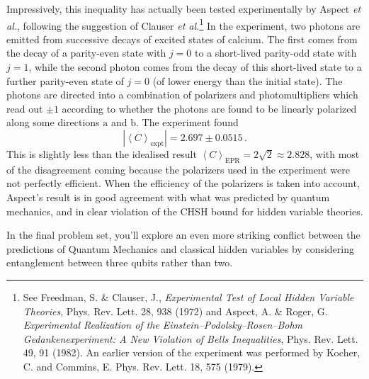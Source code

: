 \documentclass{article}
\theoremstyle{plain}\theoremheaderfont{\normalfont\itshape}\theorembodyfont{\rmfamily}\theoremseparator{.}\newtheorem*{rem}{Remark}\newtheorem*{ex}{Example}\newtheorem*{proof}{Proof}\newtheorem*{altp}{Alternative proof}
\theoremstyle{plain}\theoremheaderfont{\normalfont\bfseries}\theorembodyfont{\rmfamily}\theoremseparator{.}\newtheorem{thm}{Theorem}[section]\newtheorem{lem}[thm]{Lemma}\newtheorem{prop}[thm]{Proposition}\newtheorem*{cor}{Corollary}\newtheorem{defn}[thm]{Definition}\newtheorem{clm}[thm]{Claim}\newtheorem{clminproof}{Claim}
\theoremstyle{break}\theoremheaderfont{\normalfont\itshape}\theorembodyfont{\rmfamily}\theoremseparator{.\medskip}\newtheorem*{proofskip}{Proof}\newtheorem*{exs}{Examples}\newtheorem*{rems}{Remarks}
\theoremstyle{break}\theoremheaderfont{\normalfont\bfseries}\theorembodyfont{\rmfamily}\theoremseparator{.\medskip}\newtheorem{lemskip}[thm]{Lemma}\newtheorem{defnskip}[thm]{Definition}\newtheorem{propskip}[thm]{Proposition}\newtheorem{thmskip}[thm]{Theorem}
\numberwithin{equation}{section}
\newcommand{\eval}[1]{\left\langle #1 \right\rangle}
\newcommand{\vb}[1]{\bm{\mathrm{#1}}}
\newcommand{\abs}[1]{\left| #1 \right|}
\begin{document}
    Impressively, this inequality has actually been tested experimentally by Aspect \textit{et al.}, following the suggestion of Clauser \textit{et al.}\footnote{See Freedman, S. \& Clauser, J., \textit{Experimental Test of Local Hidden Variable Theories}, Phys. Rev. Lett. 28, 938 (1972) and Aspect, A. \& Roger, G. \textit{Experimental Realization of the Einstein--Podolsky--Rosen--Bohm Gedankenexperiment: A New Violation of Bells Inequalities}, Phys. Rev. Lett. 49, 91 (1982). An earlier version of the experiment was performed by Kocher, C. and Commins, E. Phys. Rev. Lett. 18, 575 (1979).} In the experiment, two photons are emitted from successive decays of excited states of calcium. The first comes from the decay of a parity-even state with \(j=0\) to a short-lived parity-odd state with \(j=1\), while the second photon comes from the decay of this short-lived state to a further parity-even state of \(j=0\) (of lower energy than the initial state). The photons are directed into a combination of polarizers and photomultipliers which read out \(\pm 1\) according to whether the photons are found to be linearly polarized along some directions \(\vb{a}\) and \(\vb{b}\). The experiment found
    \begin{equation}
        \abs{\eval{C}_{\text{expt}}}=2.697\pm 0.0515\,.
    \end{equation}
    This is slightly less than the idealised result \(\eval{C}_{\text{EPR}}=2\sqrt{2}\approx 2.828\), with most of the disagreement coming because the polarizers used in the experiment were not perfectly efficient. When the efficiency of the polarizers is taken into account, Aspect's result is in good agreement with what was predicted by quantum mechanics, and in clear violation of the CHSH bound for hidden variable theories.

    In the final problem set, you'll explore an even more striking conflict between the predictions of Quantum Mechanics and classical hidden variables by considering entanglement between three qubits rather than two.
\end{document}
